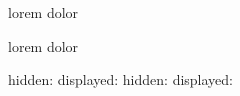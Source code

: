 


{}

\clozehide

lorem  dolor

\clozeshow

lorem  dolor

\clozehide hidden: 
\clozeshow displayed: 
\clozehide hidden: 
\clozeshow displayed: 


\bye
